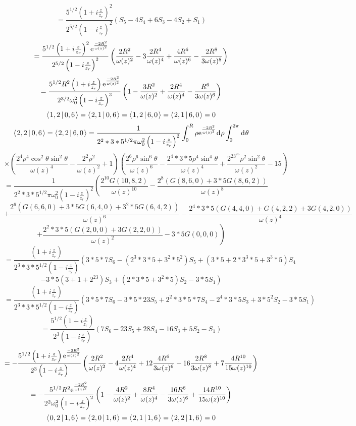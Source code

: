 \documentclass[11pt]{amsart}
\makeatletter
\newcommand{\e}{{\rm e}}				%
\newcommand{\msp}[1]{\mspace{#1mu}}		%
\newcommand{\0}{\varnothing}		%
\newcommand{\dd}{\msp{1} {\rm{d}} \msp{1}}	%
\newcommand{\brac}[2]{\left\langle\msp{2} #1\left\lvert \msp{3.5} #2 \right.\right\rangle}	%
\newcommand{\1}{!}
\newcommand{\2}{@}
\newcommand{\3}{\#}
\newcommand{\4}{\$}
\newcommand{\5}{\%}
\newcommand{\6}{$^\wedge$}
\newcommand{\7}{\&}
\newcommand{\8}{*}
\newcommand{\9}{(}
\makeatother
\begin{document}
\[
=\frac{5^{1/2}\left(1+i\frac{z}{z_r}\right)^2}{2^{5/2}\left(1-i\frac{z}{z_r}\right)^2}\left(S_5-4S_4+6S_3-4S_2+S_1\right)
\]
\[
=\frac{5^{1/2}\left(1+i\frac{z}{z_r}\right)^2\e^{\frac{-2R^2}{\omega(z)^2}}}{2^{5/2}\left(1-i\frac{z}{z_r}\right)^2}\left(\frac{2R^2}{\omega(z)^2}-3\frac{2R^4}{\omega(z)^4}+\frac{4R^6}{\omega(z)^6}-\frac{2R^8}{3\omega(z)^8}\right)
\]
\[
=\frac{5^{1/2}R^2\left(1+i\frac{z}{z_r}\right)\e^{\frac{-2R^2}{\omega(z)^2}}}{2^{3/2}\omega_0^2\left(1-i\frac{z}{z_r}\right)^3}\left(1-\frac{3R^2}{\omega(z)^2}+\frac{2R^4}{\omega(z)^4}-\frac{R^6}{3\omega(z)^6}\right)
\]
\[
\brac{1,2}{0,6} = \brac{2,1}{0,6} = \brac{1,2}{6,0} = \brac{2,1}{6,0} = 0
\]
\[
\brac{2,2}{0,6} = \brac{2,2}{6,0} =  \frac{1}{2^2*3*5^{1/2}\pi\omega_0^2\left(1-i\frac{z}{z_r}\right)^2}\int_0^R\rho \e^{\frac{-2R^2}{\omega(z)^2}}\dd \rho \int_0^{2\pi}\dd \theta
\]
\[
 \times\left(\frac{2^4\rho^4\cos^2\theta\sin^2\theta}{\omega(z)^4}-\frac{2^2\rho^2}{\omega(z)^2}+1\right)\left(\frac{2^6\rho^6\sin^6\theta}{\omega(z)^6}-\frac{2^4*3*5\rho^4\sin^4\theta}{\omega(z)^4}+\frac{2^23^25\rho^2\sin^2\theta}{\omega(z)^2}-15\right)
\]
\[
=\frac{1}{2^2*3*5^{1/2}\pi \omega_0^2\left(1-i\frac{z}{z_r}\right)^2}\left(\frac{2^{10}G(10,8,2)}{\omega(z)^{10}}-\frac{2^8\left(G(8,6,0)+3*5G(8,6,2)\right)}{\omega(z)^8}\right.
\]
\[
\left.+\frac{2^6\left(G(6,6,0)+3*5G(6,4,0)+3^2*5G(6,4,2)\right)}{\omega(z)^6}-\frac{2^4*3*5\left(G(4,4,0)+G(4,2,2)+3G(4,2,0)\right)}{\omega(z)^4}\right.
\]
\[
\left.+\frac{2^2*3*5\left(G(2,0,0)+ 3G(2,2,0)\right)}{\omega(z)^2}-3*5G(0,0,0)\right)
\]
\[
=\frac{\left(1+i\frac{z}{z_r}\right)}{2^3*3*5^{1/2}\left(1-i\frac{z}{z_r}\right)}\left(3*5*7S_6-\left(2^3*3*5+3^2*5^2\right)S_5+\left(3*5+2*3^3*5+3^3*5\right)S_4\right.
\]
\[
\left.-3*5\left(3+1+2^23\right)S_3+\left(2*3*5+3^2*5\right)S_2-3*5S_1\right)
\]
\[
=\frac{\left(1+i\frac{z}{z_r}\right)}{2^3*3*5^{1/2}\left(1-i\frac{z}{z_r}\right)}\left(3*5*7S_6-3*5*23S_5+2^2*3*5*7S_4-2^4*3*5S_3+3*5^2S_2-3*5S_1\right)
\]
\[
=\frac{5^{1/2}\left(1+i\frac{z}{z_r}\right)}{2^3\left(1-i\frac{z}{z_r}\right)}\left(7S_6-23S_5+28S_4-16S_3+5S_2-S_1\right)
\]
\[
=-\frac{5^{1/2}\left(1+i\frac{z}{z_r}\right)\e^{\frac{-2R^2}{\omega(z)^2}}}{2^3\left(1-i\frac{z}{z_r}\right)}\left(\frac{2R^2}{\omega(z)^2}-4\frac{2R^4}{\omega(z)^4}+12\frac{4R^6}{3\omega(z)^6}-16\frac{2R^8}{3\omega(z)^8}+7\frac{4R^{10}}{15\omega(z)^{10}}\right)
\]
\[
=-\frac{5^{1/2}R^2\e^{\frac{-2R^2}{\omega(z)^2}}}{2^2\omega_0^2\left(1-i\frac{z}{z_r}\right)^2}\left(1-\frac{4R^2}{\omega(z)^2}+\frac{8R^4}{\omega(z)^4}-\frac{16R^6}{3\omega(z)^6}+\frac{14R^{10}}{15\omega(z)^{10}}\right)
\]
\[
\brac{0,2}{1,6} = \brac{2,0}{1,6} = \brac{2,1}{1,6} = \brac{2,2}{1,6} = 0
\]
\end{document}
